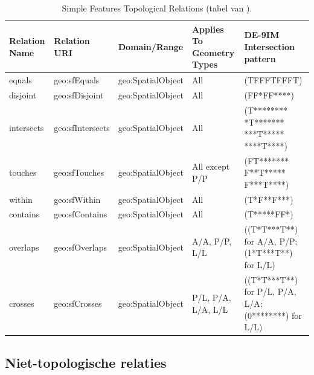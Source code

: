 \begin{table}[ht]
    \centering
    \begin{tabular}{ |p{1.5cm}|l|l|p{2cm}|p{2.5cm}| } 
        \hline
        \rowcolor{TableHeaderColor} Relation Name & Relation URI & Domain/Range & Applies To Geometry Types & DE-9IM Intersection pattern \\ \hline
        
        \rowcolor{TableColor} equals & geo:sfEquals & geo:SpatialObject & All & (TFFFTFFFT) \\ \hline
        
        \rowcolor{TableColor} disjoint & geo:sfDisjoint & geo:SpatialObject & All & (FF*FF****) \\ \hline
        
        \rowcolor{TableColor} intersects & geo:sfIntersects & geo:SpatialObject & All & (T********
        *T*******
        ***T*****
        ****T****)  \\ \hline
        
        \rowcolor{TableColor} touches & geo:sfTouches & geo:SpatialObject & All except P/P & (FT*******
        F**T*****
        F***T****) \\ \hline
        
        \rowcolor{TableColor} within & geo:sfWithin & geo:SpatialObject & All & (T*F**F***) \\ \hline
        
        \rowcolor{TableColor} contains & geo:sfContains & geo:SpatialObject & All & (T*****FF*) \\ \hline
        
        \rowcolor{TableColor} overlaps & geo:sfOverlaps & geo:SpatialObject & A/A, P/P, L/L & ((T*T***T**)
        for A/A, P/P;
        (1*T***T**)
        for L/L) \\ \hline
        
        \rowcolor{TableColor} crosses & geo:sfCrosses & geo:SpatialObject & P/L, P/A, L/A, L/L & ((T*T***T**)
        for P/L, P/A,
         L/A;
        (0********)
        for L/L) \\ \hline
        
    \end{tabular}
    \caption{Simple Features Topological Relations (tabel van \cite{ogcdocs}).}
    \label{tab:topo_sf}
\end{table}


\subsection{Niet-topologische relaties}

